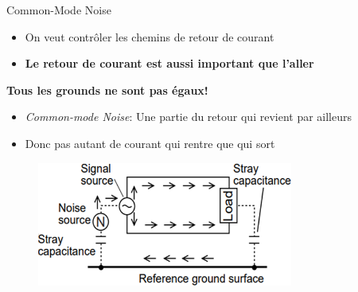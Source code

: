 \begin{frame}{Common-Mode Noise}
    \begin{itemize}
        \item On veut contrôler les chemins de retour de courant
        \item \textbf{Le retour de courant est aussi important que l'aller}
    \end{itemize}
    \begin{center}
        \textcolor{UDSgreenFierte}{\faLongArrowAltRight}
        \textbf{Tous les grounds ne sont pas égaux!}
        \textcolor{UDSgreenFierte}{\faLongArrowAltLeft}
    \end{center}
    \pause
    \begin{itemize}
        \item \textit{Common-mode Noise}: Une partie du retour qui revient par ailleurs
        \item Donc pas autant de courant qui rentre que qui sort
    \end{itemize}
    \vfill
    \begin{figure}
        \includegraphics[width=0.75\textwidth, height=0.75\textheight, keepaspectratio]{pictures/common-mode-noise.png}
    \end{figure}
\end{frame}

